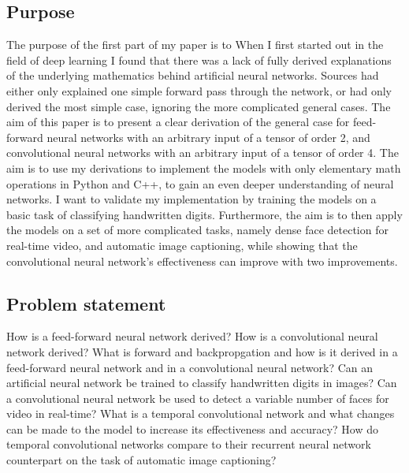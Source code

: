\documentclass[a4paper, twoside]{article}
\begin{document}
\subsection{Purpose}
The purpose of the first part of my paper is to 
When I first started out in the field of deep learning I found that there was a lack of fully derived explanations of the underlying mathematics behind artificial neural networks. Sources had either only explained one simple forward pass through the network, or had only derived the most simple case, ignoring the more complicated general cases. The aim of this paper is to present a clear derivation of the general case for feed-forward neural networks with an arbitrary input of a tensor of order 2, and convolutional neural networks with an arbitrary input of a tensor of order 4. The aim is to use my derivations to implement the models with only elementary math operations in Python and C++, to gain an even deeper understanding of neural networks. I want to validate my implementation by training the models on a basic task of classifying handwritten digits. Furthermore, the aim is to then apply the models on a set of more complicated tasks, namely dense face detection for real-time video, and automatic image captioning, while showing that the convolutional neural network's effectiveness can improve with two improvements.

\subsection{Problem statement}
How is a feed-forward neural network derived? 
How is a convolutional neural network derived?
What is forward and backpropgation and how is it derived in a feed-forward neural network and in a convolutional neural network?
Can an artificial neural network be trained to classify handwritten digits in images?
Can a convolutional neural network be used to detect a variable number of faces for video in real-time?
What is a temporal convolutional network and what changes can be made to the model to increase its effectiveness and accuracy?
How do temporal convolutional networks compare to their recurrent neural network counterpart on the task of automatic image captioning?
\end{document}
